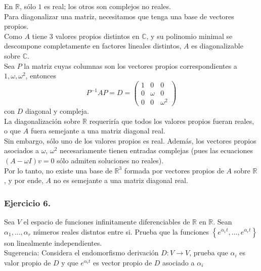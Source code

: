 \documentclass{article}
\theoremstyle{nonumberplain}
\begin{document}
En \( \mathbb{R} \), sólo \( 1 \) es real; los otros son complejos no reales. \\
Para diagonalizar una matriz, necesitamos que tenga una base de vectores propios.  \\
Como \( A \) tiene 3 valores propios distintos en \( \mathbb{C} \), y su polinomio minimal se descompone completamente en factores lineales distintos, \( A \) es diagonalizable sobre \( \mathbb{C} \). \\

Sea \( P \) la matriz cuyas columnas son los vectores propios correspondientes a \( 1, \omega, \omega^2 \), entonces
\[
P^{-1}AP = D = \begin{pmatrix}
1 & 0 & 0 \\
0 & \omega & 0 \\
0 & 0 & \omega^2
\end{pmatrix}
\]
con \( D \) diagonal y compleja. \\

La diagonalización sobre \( \mathbb{R} \) requeriría que todos los valores propios fueran reales, o que \( A \) fuera semejante a una matriz diagonal real. \\

Sin embargo, sólo uno de los valores propios es real. Además, los vectores propios asociados a \( \omega \), \( \omega^2 \) necesariamente tienen entradas complejas (pues las ecuaciones \( (A - \omega I) v = 0 \) sólo admiten soluciones no reales). \\

Por lo tanto, no existe una base de \( \mathbb{R}^3 \) formada por vectores propios de \( A \) sobre \( \mathbb{R} \), y por ende, \( A \) no es semejante a una matriz diagonal real. \\

\subsubsection*{Ejercicio 6.} Sea \( V \) el espacio de funciones infinitamente diferenciables de \( \mathbb{R} \) en \( \mathbb{R} \). Sean \( \alpha_{1}, \ldots, \alpha_{r} \) números reales distntos entre si. Prueba que la funciones \( \left\{e^{\alpha_{1} t}, \ldots, e^{\alpha_{r} t}\right\} \) son linealmente independientes. \\
Sugerencia: Considera el endomorfismo derivación \( D: V \rightarrow V \), prueba que \( \alpha_{i} \) es valor propio de \( D \) y que \( e^{\alpha_{i} t} \) es vector propio de \( D \) asociado a \( \alpha_{i} \) \\
\end{document}
